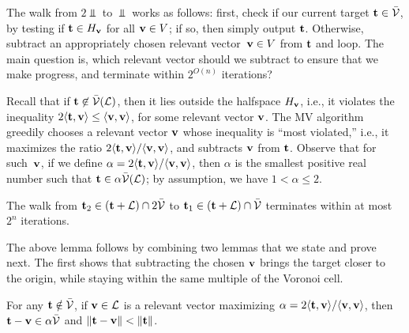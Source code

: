 \documentclass[11pt]{article}
\begin{document}
The walk from $2 \Vbar$ to $\Vbar$ works as follows: first, check if
our current target $\mathbf{t} \in \bar{\mathcal{V}}$, by testing if
$\mathbf{t} \in H_{\mathbf{v}}$ for all $\mathbf{v} \in V$; if so, then simply output
$\mathbf{t}$. Otherwise, subtract an appropriately chosen relevant
vector~$\mathbf{v} \in V$ from $\mathbf{t}$ and loop. The main question is,
which relevant vector should we subtract to ensure that we make
progress, and terminate within $2^{O(n)}$ iterations?

Recall that if $\mathbf{t} \not\in \bar{\mathcal{V}}(\mathcal{L})$, then it lies outside the
halfspace $H_{\mathbf{v}}$, i.e., it violates the inequality
$2\langle\mathbf{t}, \mathbf{v}\rangle \leq \langle\mathbf{v}, \mathbf{v}\rangle$, for some relevant
vector $\mathbf{v}$. The MV algorithm greedily chooses a relevant vector
$\mathbf{v}$ whose inequality is ``most violated,'' i.e., it maximizes the
ratio $2 \langle\mathbf{t}, \mathbf{v}\rangle/\langle\mathbf{v}, \mathbf{v}\rangle$, and subtracts
$\mathbf{v}$ from $\mathbf{t}$. Observe that for such~$\mathbf{v}$, if we define
$\alpha = 2\langle\mathbf{t}, \mathbf{v}\rangle/\langle\mathbf{v},\mathbf{v}\rangle$, then $\alpha$ is
the smallest positive real number such that
$\mathbf{t} \in \alpha \bar{\mathcal{V}}(\mathcal{L})$; by assumption, we have
$1 < \alpha \leq 2$.

\begin{lemma}
  \label{lem:MV-steps}
  The walk from $\mathbf{t}_{2} \in (\mathbf{t}+\mathcal{L}) \cap 2\bar{\mathcal{V}}$ to
  $\mathbf{t}_{1} \in (\mathbf{t}+\mathcal{L}) \cap \bar{\mathcal{V}}$ terminates within at most
  $2^{n}$ iterations.
\end{lemma}

The above lemma follows by combining two lemmas that we state and
prove next. The first shows that subtracting the chosen $\mathbf{v}$ brings
the target closer to the origin, while staying within the same
multiple of the Voronoi cell.

\begin{lemma}
  \label{lem:MV-progress}
  For any $\mathbf{t} \notin \bar{\mathcal{V}}$, if $\mathbf{v} \in \mathcal{L}$ is a relevant
  vector maximizing
  $\alpha = 2 \langle\mathbf{t}, \mathbf{v}\rangle/\langle\mathbf{v}, \mathbf{v}\rangle$, then
  $\mathbf{t} - \mathbf{v} \in \alpha \bar{\mathcal{V}}$ and
  $\lVert\mathbf{t} - \mathbf{v}\rVert < \lVert\mathbf{t}\rVert$.
\end{lemma}
\end{document}
